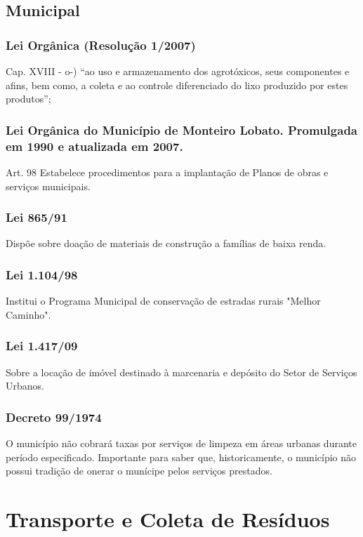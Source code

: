 \begin{subapend}
	\subsection{Municipal}
	\begin{subsubapend}
		\item \subsubsection{Lei Orgânica (Resolução 1/2007)}
		Cap. XVIII - o-) “ao uso e armazenamento dos agrotóxicos, seus componentes e afins, bem como, a coleta e ao controle diferenciado do lixo produzido por estes produtos”;
		\subsubsection{Lei Orgânica do Município de Monteiro Lobato. Promulgada em 1990 e atualizada em 2007.}
		Art. 98
		Estabelece procedimentos para a implantação de Planos de obras e serviços municipais.
		\subsubsection{Lei 865/91}
		Dispõe sobre doação de materiais de construção a famílias de baixa renda.
		\subsubsection{Lei 1.104/98}
		Institui o Programa Municipal de conservação de estradas rurais "Melhor Caminho".
		\subsubsection{Lei 1.417/09}
		Sobre a locação de imóvel destinado à marcenaria e depósito do Setor de Serviços Urbanos.
		\subsubsection{Decreto 99/1974}
		O município não cobrará taxas por serviços de limpeza em áreas urbanas durante período especificado. Importante para saber que, historicamente, o município não possui tradição de onerar o munícipe pelos serviços prestados.
	\end{subsubapend}
\end{subapend}

\section{Transporte e Coleta de Resíduos}

